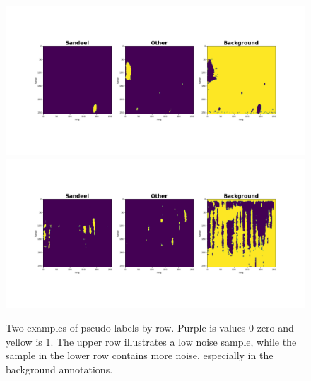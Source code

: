         \clearpage
        \begin{figure}[H]
            \centering
            \includegraphics[scale=0.32]{figures/data_sample.png}
          	\includegraphics[scale=0.32]{figures/data_sample_noisy.png}
            \caption[Example pseudo label]{Two examples of pseudo labels by row. Purple is values 0 zero and yellow is 1. The upper row illustrates a low noise sample, while the sample in the lower row contains more noise, especially in the background annotations.}
            \label{data sample fig}
        \end{figure}        
        
        
